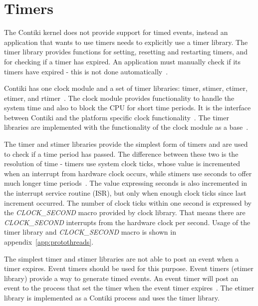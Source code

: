 
\section{Timers}\label{sec:contiki-timers}
The Contiki kernel does not provide support for timed events,
instead an application that wants to use timers needs to explicitly use a timer library.
The timer library provides functions for setting, resetting and restarting timers,
and for checking if a timer has expired.
An application must manually check if its timers have expired - this is not done automatically~\cite{contiki-docs}.

Contiki has one clock module and a set of timer libraries: timer, stimer, ctimer, etimer, and rtimer~\cite{contiki-wiki-timers}.
The clock module provides functionality to handle the system time and also to block the CPU for short time periods.
It is the interface between Contiki and the platform specific clock functionality~\cite{contiki-docs}.
The timer libraries are implemented with the functionality of the clock module as a base~\cite{contiki-wiki-timers}.

The timer and stimer libraries provide the simplest form of timers and are used to check if a time period has passed.
The difference between these two is the resolution of time -
timers use system clock ticks, whose value is incremented when an interrupt from hardware clock occurs,
while stimers use seconds to offer much longer time periods~\cite{contiki-wiki-timers}.
The value expressing seconds is also incremented in the interrupt service routine (ISR),
but only when enough clock ticks since last increment occurred.
The number of clock ticks within one second is expressed by the
{\it{CLOCK\_SECOND}} macro provided by clock library.
That means there are {\it{CLOCK\_SECOND}} interrupts from the hardware clock per second.
Usage of the timer library and {\it{CLOCK\_SECOND}} macro is shown in appendix~\ref{app:protothreads}.

The simplest timer and stimer libraries are not able to post an event when a timer expires.
Event timers should be used for this purpose.
Event timers (etimer library) provide a way to generate timed events.
An event timer will post an event to the process that set the timer when the
event timer expires~\cite{contiki-docs}.
The etimer library is implemented as a Contiki process and uses the timer library.

